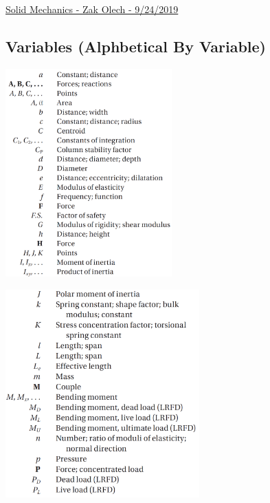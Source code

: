 \documentclass[10pt,landscape]{article}
\newenvironment{Figure}
     {\par\medskip\noindent\minipage{\linewidth}}
     {\endminipage\par\medskip}
\begin{document}
\raggedright
\footnotesize

\begin{center}
     \Large{\underline{Solid Mechanics - Zak Olech - 9/24/2019}}
\end{center}
\begin{multicols}{3}

\setlength{\columnseprule}{0.25pt}
\setlength{\premulticols}{1pt}
\setlength{\postmulticols}{1pt}
\setlength{\multicolsep}{1pt}
\setlength{\columnsep}{2pt}

\section{Variables (Alphbetical By Variable)}
\begin{Figure}
    \centering
    \includegraphics[width=\linewidth, height=8cm]{ListOfSymbols_Part_1.png}
\end{Figure}
\begin{Figure}
    \centering
    \includegraphics[width=\linewidth, height=8cm]{ListOfSymbols_Part_2.png}

\end{Figure}
\end{multicols}
\end{document}
